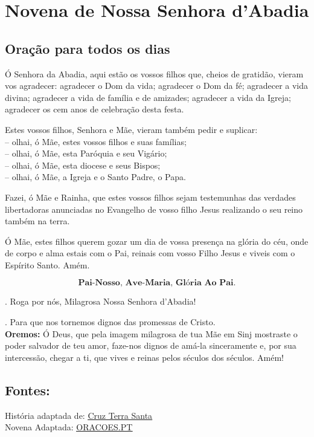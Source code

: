 \documentclass[a4paper,14pt]{extarticle} \usepackage[utf8]{inputenc}
\makeatletter
\newcommand{\vers@resp@sym}{%
  \raisebox{0.2ex}{\rotatebox[origin=c]{-20}{$\m@th\rceil$}}%
}
\newcommand{\vers@resp}[2]{%
  {\ooalign{%
     \hidewidth\kern#1\vers@resp@sym\hidewidth\cr
     #2\cr
  }}%
}
\DeclareRobustCommand{\versicle}{\vers@resp{-0.1em}{V}}
\DeclareRobustCommand{\response}{\vers@resp{0pt}{R}}
\makeatother
\begin{document}
\newpage

\section{Novena de Nossa Senhora d'Abadia}
\subsection*{Oração para todos os dias}

Ó Senhora da Abadia, aqui estão os vossos filhos que, cheios de gratidão, vieram vos agradecer: agradecer o Dom da vida; agradecer o Dom da fé; agradecer a vida divina; agradecer a vida de família e de amizades; agradecer a vida da Igreja; agradecer os cem anos de celebração desta festa.

Estes vossos filhos, Senhora e Mãe, vieram também pedir e suplicar: \\
-- olhai, ó Mãe, estes vossos filhos e suas famílias; \\
-- olhai, ó Mãe, esta Paróquia e seu Vigário; \\
-- olhai, ó Mãe, esta diocese e seus Bispos; \\
-- olhai, ó Mãe, a Igreja e o Santo Padre, o Papa. 

Fazei, ó Mãe e Rainha, que estes vossos filhos sejam testemunhas das verdades libertadoras anunciadas no Evangelho de vosso filho Jesus realizando o seu reino também na terra.

Ó Mãe, estes filhos querem gozar um dia de vossa presença na glória do céu, onde de corpo e alma estais com o Pai, reinais com vosso Filho Jesus e viveis com o Espírito Santo. Amém. 


\[
  \textbf{Pai-Nosso, Ave-Maria, Glória Ao Pai.}
\]

\response. \quad Roga por nós, Milagrosa Nossa Senhora d'Abadia!

\versicle. \quad Para que nos tornemos dignos das promessas de Cristo. \\




\textbf{Oremos:} Ó Deus, que pela imagem milagrosa de tua Mãe em Sinj mostraste o poder salvador de teu amor, faze-nos dignos de amá-la sinceramente e, por sua intercessão, chegar a ti, que vives e reinas pelos séculos dos séculos. Amém!


\vfill

\begin{center}
\subsection*{Fontes:}
História adaptada de: \underline{\href{https://cruzterrasanta.com.br/historia-de-nossa-senhora-abadia/20/102/}{Cruz Terra Santa}}\\ 
Novena Adaptada: \underline{\href{https://oracoes.pt/novena-a-nossa-senhora-de-sinjska/}{ORACOES.PT}}
\end{center}
\end{document}
